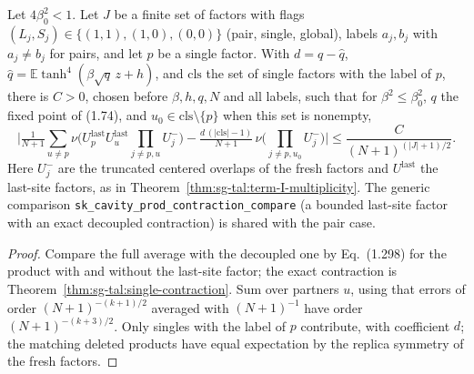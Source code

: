 \begin{theorem}
\label{thm:sg-tal:single-term-I}
\leanok
{}
Let $4\beta_0^2<1$. Let $J$ be a finite set of factors with flags $(L_j,S_j)\in
\{(1,1),(1,0),(0,0)\}$ (pair, single, global), labels $a_j,b_j$ with $a_j\ne b_j$ for pairs, and let
$p$ be a single factor. With $d=q-\hat q$, $\hat q=\mathbb E\tanh^4(\beta\sqrt q\,z+h)$, and
$\mathrm{cls}$ the set of single factors with the label of $p$, there is $C>0$, chosen before
$\beta,h,q,N$ and all labels, such that for $\beta^2\le\beta_0^2$, $q$ the fixed point of (1.74), and
$u_0\in\mathrm{cls}\setminus\{p\}$ when this set is nonempty,
\[
 \Big|\tfrac1{N+1}\sum_{u\ne p}\nu\big(U_p^{\mathrm{last}}U_u^{\mathrm{last}}\!\!\prod_{j\ne p,u}U_j^-\big)
 -\tfrac{d\,(|\mathrm{cls}|-1)}{N+1}\,\nu\Big(\prod_{j\ne p,u_0}U_j^-\Big)\Big|
 \le\frac{C}{(N+1)^{(|J|+1)/2}}.
\]
Here $U_j^-$ are the truncated centered overlaps of the fresh factors and $U^{\mathrm{last}}$ the
last-site factors, as in Theorem~\ref{thm:sg-tal:term-I-multiplicity}. The generic comparison
\texttt{sk\_cavity\_prod\_contraction\_compare} (a bounded last-site factor with an exact
decoupled contraction) is shared with the pair case.
\end{theorem}
\begin{proof}
\leanok
Compare the full average with the decoupled one by Eq.~(1.298) for the product with and without
the last-site factor; the exact contraction is Theorem~\ref{thm:sg-tal:single-contraction}. Sum over
partners $u$, using that errors of order $(N+1)^{-(k+1)/2}$ averaged with $(N+1)^{-1}$ have order
$(N+1)^{-(k+3)/2}$. Only singles with the label of $p$ contribute, with coefficient $d$; the matching
deleted products have equal expectation by the replica symmetry of the fresh factors.
\end{proof}

